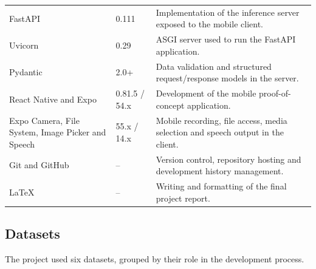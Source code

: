 \begin{table}[!htbp]
\begin{tabular}{@{}p{3.0cm} p{3.0cm} p{7.2cm}@{}}
        FastAPI                                           & 0.111            & Implementation of the inference server exposed to the mobile client.                                     \\
        Uvicorn                                           & 0.29             & ASGI server used to run the FastAPI application.                                                         \\
        Pydantic                                          & 2.0+             & Data validation and structured request/response models in the server.                                    \\
        React Native and Expo                             & 0.81.5 / 54.x    & Development of the mobile proof-of-concept application.                                                  \\
        Expo Camera, File System, Image Picker and Speech & 55.x / 14.x      & Mobile recording, file access, media selection and speech output in the client.                          \\
        Git and GitHub                                    & --               & Version control, repository hosting and development history management.                                  \\
        \LaTeX                                            & --               & Writing and formatting of the final project report.                                                      \\
        \bottomrule
    \end{tabular}
\end{table}

\subsection{Datasets}

The project used six datasets, grouped by their role in the development process.

